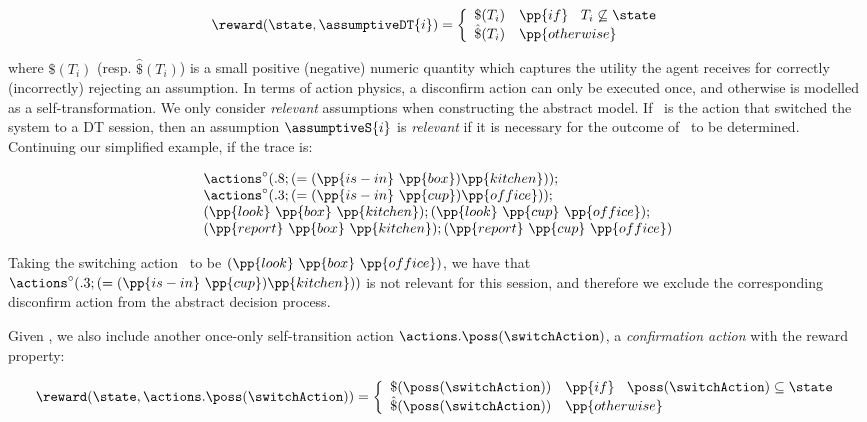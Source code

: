 \vspace{-1ex}
\small
\[
\reward(\state, \assumptiveDT{i}) = \bigg\{ \begin{array}{ll}
\$(T_i) & \pp{if}~\;\;T_i \not\subseteq \state \\
\hat\$(T_i) & \pp{otherwise} \\
\end{array}
\]
\normalsize

\vspace{-1ex}

\noindent where $\$(T_i)$ (resp. $\hat\$(T_i)$) is a
small positive (negative) numeric quantity which captures
the utility the agent receives for correctly (incorrectly) rejecting
an assumption.
In terms of action physics, a disconfirm action can only be executed
once, and otherwise is modelled as a self-transformation.
We only consider {\em relevant} assumptions when constructing the
abstract model.  If \switchAction\ is the action that switched the
system to a DT session, then an assumption $\assumptiveS{i}$ is {\em
relevant} if it is necessary for the outcome of \switchAction\ to be
determined.  Continuing our simplified example, if the trace is:

\small
\[
\begin{array}{l}
\actions^{\circ}(.8;(=(\pp{is-in}~\pp{box})\pp{kitchen}));\\
\actions^{\circ}(.3;(=(\pp{is-in}~\pp{cup})\pp{office}));\\
(\pp{look}~\pp{box}~\pp{kitchen});
(\pp{look}~\pp{cup}~\pp{office});\\
(\pp{report}~\pp{box}~\pp{kitchen}); 
(\pp{report}~\pp{cup}~\pp{office})
\end{array}
\]
\normalsize

\noindent Taking the switching action \switchAction\ to be
$(\pp{look}~\pp{box}~\pp{office})$, we have that
$\actions^{\circ}(.3;(=(\pp{is-in}~\pp{cup})\pp{kitchen}))$ is not
relevant for this session, and therefore we exclude the corresponding
disconfirm action from the abstract decision process.

Given \switchAction, we also include another once-only self-transition
action $\actions.\poss(\switchAction)$, a \emph{confirmation action}
with the reward property:

\[
\reward(\state, \actions.\poss(\switchAction)) = \bigg\{ \begin{array}{ll}
\$(\poss(\switchAction)) & \pp{if}~\;\; \poss(\switchAction) \subseteq \state \\
\hat\$(\poss(\switchAction)) & \pp{otherwise} \\
\end{array}
\]

